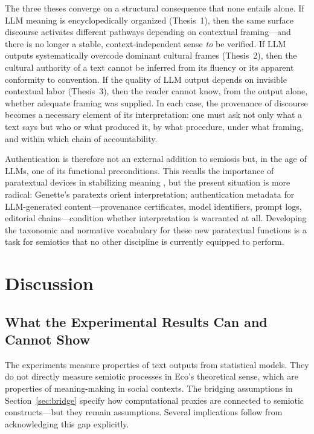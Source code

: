 \documentclass[12pt,a4paper]{article}
\begin{document}
The three theses converge on a structural consequence that none entails alone.
If LLM meaning is encyclopedically organized (Thesis~1), then the same
surface discourse activates different pathways depending on contextual
framing---and there is no longer a stable, context-independent sense
\emph{to} be verified. If LLM outputs systematically overcode dominant
cultural frames (Thesis~2), then the cultural authority of a text cannot be
inferred from its fluency or its apparent conformity to convention. If the
quality of LLM output depends on invisible contextual labor (Thesis~3), then
the reader cannot know, from the output alone, whether adequate framing was
supplied. In each case, the provenance of discourse becomes a necessary element
of its interpretation: one must ask not only what a text says but who or what
produced it, by what procedure, under what framing, and within which chain of
accountability.

Authentication is therefore not an external addition to semiosis but, in the
age of LLMs, one of its functional preconditions. This recalls the importance
of paratextual devices in stabilizing meaning \citep{Genette1997}, but the
present situation is more radical: Genette's paratexts orient interpretation;
authentication metadata for LLM-generated content---provenance certificates,
model identifiers, prompt logs, editorial chains---condition whether
interpretation is warranted at all. Developing the taxonomic and normative
vocabulary for these new paratextual functions is a task for semiotics that
no other discipline is currently equipped to perform.


\section{Discussion}
\label{sec:discussion}

\subsection{What the Experimental Results Can and Cannot Show}

The experiments measure properties of text outputs from statistical models.
They do not directly measure semiotic processes in Eco's theoretical sense,
which are properties of meaning-making in social contexts. The bridging
assumptions in Section~\ref{sec:bridge} specify how computational proxies
are connected to semiotic constructs---but they remain assumptions. Several
implications follow from acknowledging this gap explicitly.
\end{document}
